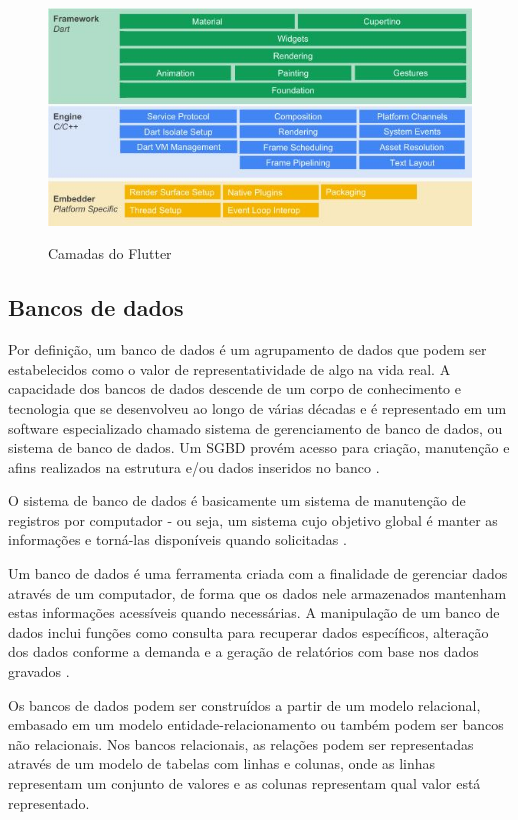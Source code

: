 \begin{figure}[htb]
    \caption{Camadas do Flutter}
    \centering
    \includegraphics [scale=1.05,]{img/flutter_layers.JPG}
    \label{fig:flutter_layers}
\end{figure}

\newpage

\subsection{Bancos de dados}
Por definição, um banco de dados é um agrupamento de dados que podem ser estabelecidos como o valor de representatividade de algo na vida real. A capacidade dos bancos de dados descende de um corpo de conhecimento e tecnologia que se desenvolveu ao longo de várias décadas e é representado em um software especializado chamado sistema de gerenciamento de banco de dados, ou sistema de banco de dados. Um SGBD provém acesso para criação, manutenção e afins realizados na estrutura e/ou dados inseridos no banco \citep{sbd_korth_silberchatz}.

O sistema de banco de dados é basicamente um sistema de manutenção de registros por computador - ou seja, um sistema cujo objetivo global é manter as informações e torná-las disponíveis quando solicitadas \citep{isbd_cjdate}.

Um banco de dados é uma ferramenta criada com a finalidade de gerenciar dados através de um computador, de forma que os dados nele armazenados mantenham estas informações acessíveis quando necessárias. A manipulação de um banco de dados inclui funções como consulta para recuperar dados específicos, alteração dos dados conforme a demanda e a geração de relatórios com base nos dados gravados \citep{sbd_elmasri_navathe_2011}. 

Os bancos de dados podem ser construídos a partir de um modelo relacional, embasado em um modelo entidade-relacionamento ou também podem ser bancos não relacionais. Nos bancos relacionais, as relações podem ser representadas através de um modelo de tabelas com linhas e colunas, onde as linhas representam um conjunto de valores e as colunas representam qual valor está representado.

